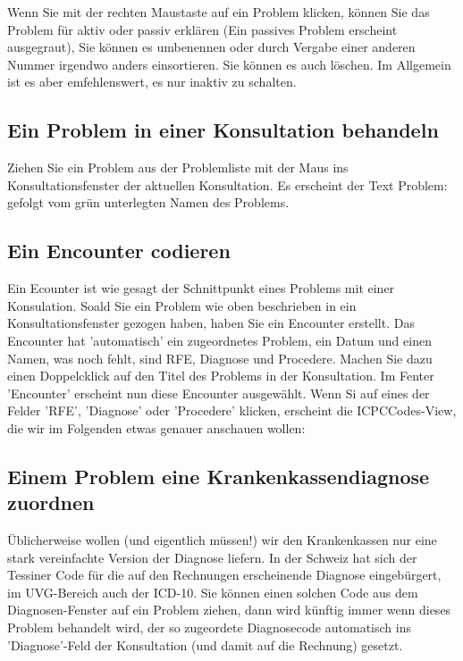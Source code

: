 \documentclass[a4paper]{scrartcl}
\begin{document}
\medskip

Wenn Sie mit der rechten Maustaste auf ein Problem klicken, können Sie das Problem für aktiv oder passiv erklären (Ein passives Problem erscheint ausgegraut), Sie können es umbenennen oder durch Vergabe einer anderen Nummer irgendwo anders einsortieren. Sie können es auch löschen. Im Allgemein ist es aber emfehlenswert, es nur inaktiv zu schalten.



\subsection{Ein Problem in einer Konsultation behandeln}
Ziehen Sie ein Problem aus der Problemliste mit der Maus ins Konsultationsfenster der aktuellen Konsultation. Es erscheint der Text Problem: gefolgt vom grün unterlegten Namen des Problems.

\subsection{Ein Encounter codieren}
Ein Ecounter ist wie gesagt der Schnittpunkt eines Problems mit einer Konsulation. Soald Sie ein Problem wie oben beschrieben in ein Konsultationsfenster gezogen haben, haben Sie ein Encounter erstellt. Das Encounter hat 'automatisch' ein zugeordnetes Problem, ein Datum und einen Namen, was noch fehlt, sind RFE, Diagnose und Procedere. Machen Sie dazu einen Doppelcklick auf den Titel des Problems in der Konsultation. Im Fenter 'Encounter' erscheint nun diese Encounter ausgewählt. Wenn Si auf eines der Felder 'RFE', 'Diagnose' oder 'Procedere' klicken, erscheint die ICPCCodes-View, die wir im Folgenden etwas genauer anschauen wollen:



\subsection{Einem Problem eine Krankenkassendiagnose zuordnen}
Üblicherweise wollen (und eigentlich müssen!) wir den Krankenkassen nur eine stark vereinfachte Version der Diagnose liefern. In der Schweiz hat sich der Tessiner Code für die auf den Rechnungen erscheinende Diagnose eingebürgert, im UVG-Bereich auch der ICD-10. Sie können einen solchen Code aus dem Diagnosen-Fenster auf ein Problem ziehen, dann wird künftig immer wenn dieses Problem behandelt wird, der so zugeordete Diagnosecode automatisch ins 'Diagnose'-Feld der Konsultation (und damit auf die Rechnung) gesetzt.
\end{document}
